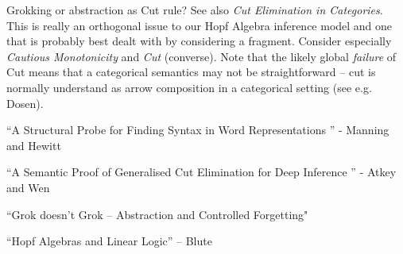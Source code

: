 \documentclass[a4paper,11pt]{report}
\begin{document}
Grokking or abstraction as Cut rule? See also \emph{Cut Elimination in Categories}. This is really an orthogonal issue to our Hopf Algebra inference model and one that is probably best dealt with by considering a fragment.  Consider especially \emph{Cautious Monotonicity} and \emph{Cut} (converse). Note that the likely global \emph{failure} of Cut means that a categorical semantics may not be straightforward -- cut is normally understand as arrow composition in a categorical setting (see e.g. Dosen).

``A Structural Probe for Finding Syntax in Word Representations
'' - Manning and Hewitt

``A Semantic Proof of Generalised Cut Elimination for Deep Inference
'' - Atkey and Wen

``Grok doesn't Grok -- Abstraction and Controlled Forgetting"

``Hopf Algebras and Linear Logic'' -- Blute



\end{document}
